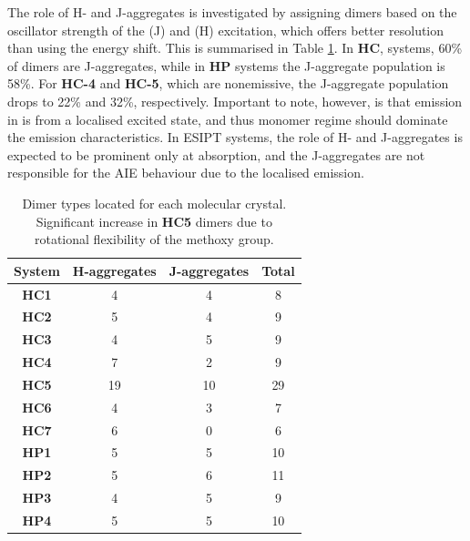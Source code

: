 The role of H- and J-aggregates is investigated by assigning dimers based on the oscillator strength of the \sone{} (J) and \stwo{} (H) excitation, which offers better resolution than using the energy shift. This is summarised in Table \ref{table: dimer_types}. In \textbf{HC}, systems, 60\% of dimers are J-aggregates, while in \textbf{HP} systems the J-aggregate population is 58\%. For \textbf{HC-4} and \textbf{HC-5}, which are nonemissive, the J-aggregate population drops to 22\% and 32\%, respectively. Important to note, however, is that emission in \Kstar{} is from a localised excited state, and thus monomer regime should dominate the emission characteristics. In ESIPT systems, the role of H- and J-aggregates is expected to be prominent only at absorption, and the J-aggregates are not responsible for the AIE behaviour due to the localised emission.

\begin{table}[t]
\centering
\caption[Dimer types for \textbf{HC} and \textbf{HP} molecular crystals]{Dimer types located for each molecular crystal. Significant increase in \textbf{HC5} dimers due to rotational flexibility of the methoxy group.} 
  \label{table: dimer_types}
  \begin{tabular}{cccc}
  \hline
  System & H-aggregates & J-aggregates & Total\\
  \hline
  \textbf{HC1} & 4 & 4 & 8\\
  \textbf{HC2} & 5 & 4 & 9 \\
  \textbf{HC3} & 4 & 5 & 9\\
  \textbf{HC4} & 7 & 2 & 9\\
  \textbf{HC5} & 19 & 10 & 29 \\
  \textbf{HC6} & 4 & 3 & 7\\
  \textbf{HC7} & 6 & 0 & 6\\
  \hline
  \textbf{HP1} & 5 & 5 & 10\\
  \textbf{HP2} & 5 & 6 & 11\\
  \textbf{HP3} & 4 & 5 & 9\\
  \textbf{HP4} & 5 & 5 & 10\\
  \hline
  \end{tabular}
\end{table}

